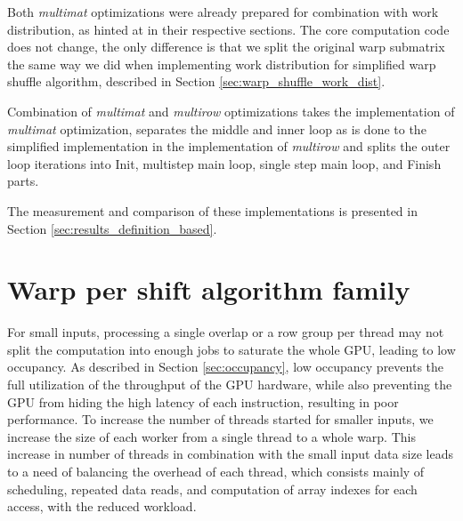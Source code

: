 Both \textit{multimat} optimizations were already prepared for combination with work distribution, as hinted at in their respective sections. The core computation code does not change, the only difference is that we split the original warp submatrix the same way we did when implementing work distribution for simplified warp shuffle algorithm, described in Section \ref{sec:warp_shuffle_work_dist}.

Combination of \textit{multimat} and \textit{multirow} optimizations takes the implementation of \textit{multimat} optimization, separates the middle and inner loop as is done to the simplified implementation in the implementation of \textit{multirow} and splits the outer loop iterations into Init, multistep main loop, single step main loop, and Finish parts.

The measurement and comparison of these implementations is presented in Section \ref{sec:results_definition_based}.

\section{Warp per shift algorithm family}
\label{sec:warp_per_shift}


For small inputs, processing a single overlap or a row group per thread may not split the computation into enough jobs to saturate the whole GPU, leading to low occupancy. As described in Section \ref{sec:occupancy}, low occupancy prevents the full utilization of the throughput of the GPU hardware, while also preventing the GPU from hiding the high latency of each instruction, resulting in poor performance. To increase the number of threads started for smaller inputs, we increase the size of each worker from a single thread to a whole warp. This increase in number of threads in combination with the small input data size leads to a need of balancing the overhead of each thread, which consists mainly of scheduling, repeated data reads, and computation of array indexes for each access, with the reduced workload. 


